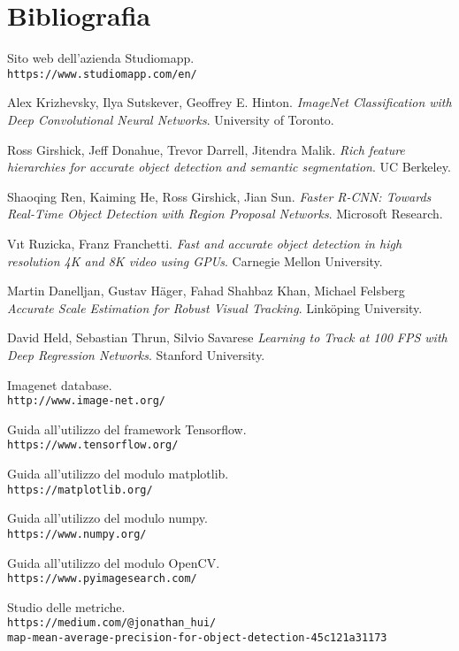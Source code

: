 \section{Bibliografia}

\begin{thebibliography}{99}

Sito web dell'azienda Studiomapp.
\\\texttt{https://www.studiomapp.com/en/}
 
Alex Krizhevsky, Ilya Sutskever, Geoffrey E. Hinton.
\textit{ImageNet Classification with Deep Convolutional
Neural Networks}. University of Toronto. 
 
Ross Girshick, Jeff Donahue, Trevor Darrell, Jitendra Malik.
\textit{Rich feature hierarchies for accurate object detection and semantic segmentation}. UC Berkeley. 
 
Shaoqing Ren, Kaiming He, Ross Girshick, Jian Sun.
\textit{Faster R-CNN: Towards Real-Time Object Detection
with Region Proposal Networks}. Microsoft Research.
 
Vıt Ruzicka, Franz Franchetti.
\textit{Fast and accurate object detection in high resolution 4K and 8K video using GPUs}. Carnegie Mellon University.

Martin Danelljan, Gustav Häger, Fahad Shahbaz Khan, Michael Felsberg 
\textit{Accurate Scale Estimation for
Robust Visual Tracking}. Linköping University.

David Held, Sebastian Thrun, Silvio Savarese
\textit{Learning to Track at 100 FPS with Deep Regression Networks}. Stanford University.

Imagenet database.
\\\texttt{http://www.image-net.org/}

Guida all'utilizzo del framework Tensorflow.
\\\texttt{https://www.tensorflow.org/}

Guida all'utilizzo del modulo matplotlib.
\\\texttt{https://matplotlib.org/}

Guida all'utilizzo del modulo numpy.
\\\texttt{https://www.numpy.org/}

Guida all'utilizzo del modulo OpenCV.
\\\texttt{https://www.pyimagesearch.com/}

Studio delle metriche.
\\\texttt{https://medium.com/@jonathan\_hui/\\
map-mean-average-precision-for-object-detection-45c121a31173}

\end{thebibliography}